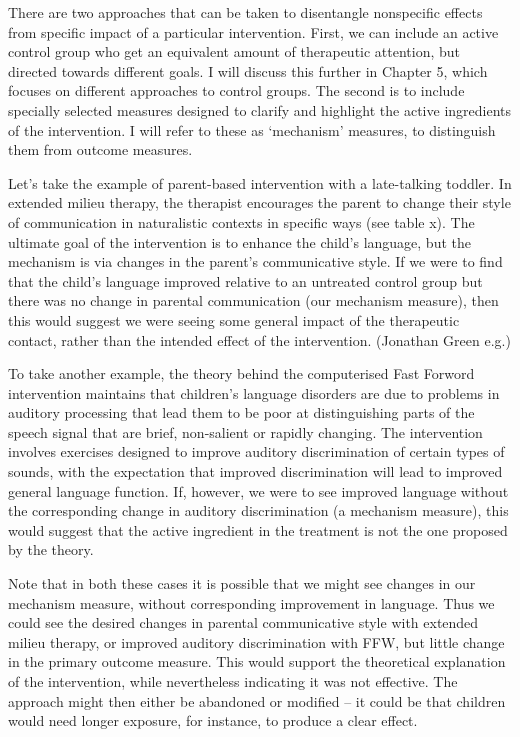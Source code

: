 \documentclass[]{book}
\begin{document}
There are two approaches that can be taken to disentangle nonspecific effects from specific impact of a particular intervention. First, we can include an active control group who get an equivalent amount of therapeutic attention, but directed towards different goals. I will discuss this further in Chapter 5, which focuses on different approaches to control groups. The second is to include specially selected measures designed to clarify and highlight the active ingredients of the intervention. I will refer to these as `mechanism' measures, to distinguish them from outcome measures.

Let's take the example of parent-based intervention with a late-talking toddler. In extended milieu therapy, the therapist encourages the parent to change their style of communication in naturalistic contexts in specific ways (see table x). The ultimate goal of the intervention is to enhance the child's language, but the mechanism is via changes in the parent's communicative style. If we were to find that the child's language improved relative to an untreated control group but there was no change in parental communication (our mechanism measure), then this would suggest we were seeing some general impact of the therapeutic contact, rather than the intended effect of the intervention.
(Jonathan Green e.g.)

To take another example, the theory behind the computerised Fast Forword intervention maintains that children's language disorders are due to problems in auditory processing that lead them to be poor at distinguishing parts of the speech signal that are brief, non-salient or rapidly changing. The intervention involves exercises designed to improve auditory discrimination of certain types of sounds, with the expectation that improved discrimination will lead to improved general language function. If, however, we were to see improved language without the corresponding change in auditory discrimination (a mechanism measure), this would suggest that the active ingredient in the treatment is not the one proposed by the theory.

Note that in both these cases it is possible that we might see changes in our mechanism measure, without corresponding improvement in language. Thus we could see the desired changes in parental communicative style with extended milieu therapy, or improved auditory discrimination with FFW, but little change in the primary outcome measure. This would support the theoretical explanation of the intervention, while nevertheless indicating it was not effective. The approach might then either be abandoned or modified -- it could be that children would need longer exposure, for instance, to produce a clear effect.
\end{document}
